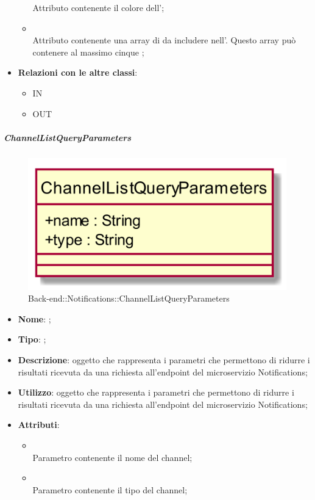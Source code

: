 \begin{itemize}
\begin{itemize}
		Attributo contenente il colore dell';
		\item[]  \\
		Attributo contenente una array di  da includere nell'. Questo array può contenere al massimo cinque ;
	\end{itemize}
	\item \textbf{Relazioni con le altre classi}:
	\begin{itemize}
		\item IN \hyperlink{NotificationMessage_label}{}
		\item OUT \hyperlink{Action_label}{}
	\end{itemize}
\end{itemize}
\FloatBarrier

\hypertarget{ChannelListQueryParameters_label}{\subparagraph{ChannelListQueryParameters}}
\begin{figure}[h]
	\centering
	\includegraphics[width=\textwidth,height=\textheight,keepaspectratio]{images/ClassChannelListQueryParameters.png}
	\caption{Back-end::Notifications::ChannelListQueryParameters}
\end{figure}
\begin{itemize}
	\item \textbf{Nome}: ;
	\item \textbf{Tipo}: ;
	\item \textbf{Descrizione}: oggetto che rappresenta i parametri che permettono di ridurre i risultati ricevuta da una richiesta all'endpoint  del microservizio Notifications;
	\item \textbf{Utilizzo}: oggetto che rappresenta i parametri che permettono di ridurre i risultati ricevuta da una richiesta all'endpoint  del microservizio Notifications;
	\item \textbf{Attributi}:
	\begin{itemize}
		\item[]  \\
		Parametro contenente il nome del channel;
		\item[]  \\
		Parametro contenente il tipo del channel;
	\end{itemize}
\end{itemize}
\FloatBarrier

